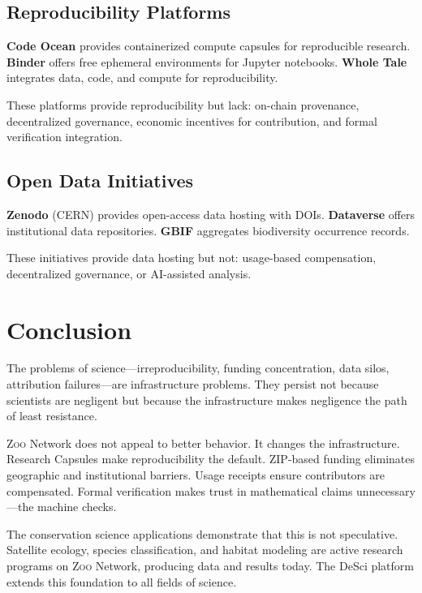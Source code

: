 \documentclass[11pt,letterpaper]{article}
\theoremstyle{definition}
\theoremstyle{remark}
\newcommand{\Zoo}{\textsc{Zoo}}
\newcommand{\ZIP}{\textsc{ZIP}}
\begin{document}
\subsection{Reproducibility Platforms}

\textbf{Code Ocean} provides containerized compute capsules for reproducible research. \textbf{Binder} offers free ephemeral environments for Jupyter notebooks. \textbf{Whole Tale} integrates data, code, and compute for reproducibility.

These platforms provide reproducibility but lack: on-chain provenance, decentralized governance, economic incentives for contribution, and formal verification integration.

\subsection{Open Data Initiatives}

\textbf{Zenodo} (CERN) provides open-access data hosting with DOIs. \textbf{Dataverse} offers institutional data repositories. \textbf{GBIF} aggregates biodiversity occurrence records.

These initiatives provide data hosting but not: usage-based compensation, decentralized governance, or AI-assisted analysis.

\section{Conclusion}
\label{sec:conclusion}

The problems of science---irreproducibility, funding concentration, data silos, attribution failures---are infrastructure problems. They persist not because scientists are negligent but because the infrastructure makes negligence the path of least resistance.

\Zoo{} Network does not appeal to better behavior. It changes the infrastructure. Research Capsules make reproducibility the default. \ZIP{}-based funding eliminates geographic and institutional barriers. Usage receipts ensure contributors are compensated. Formal verification makes trust in mathematical claims unnecessary---the machine checks.

The conservation science applications demonstrate that this is not speculative. Satellite ecology, species classification, and habitat modeling are active research programs on \Zoo{} Network, producing data and results today. The DeSci platform extends this foundation to all fields of science.
\end{document}
